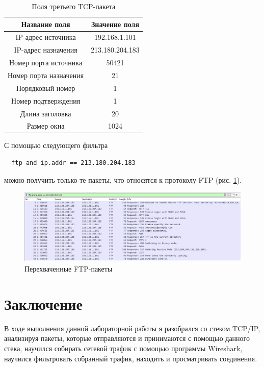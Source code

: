 \documentclass[a4paper, 14pt]{extarticle}
\begin{document}
\begin{table}[H]
  \caption{Поля третьего TCP-пакета}
  \label{tab:tcp-3}

  \centering
  \renewcommand*{\arraystretch}{1.2}
  \setlength{\tabcolsep}{12pt}

  \begin{tabular}{|c|c|}
    \hline
    \textbf{Название поля} & \textbf{Значение поля} \\
    \hline
    IP-адрес источника & 192.168.1.101 \\
    \hline
    IP-адрес назначения & 213.180.204.183 \\
    \hline
    Номер порта источника & 50421 \\
    \hline
    Номер порта назначения & 21 \\
    \hline
    Порядковый номер & 1 \\
    \hline
    Номер подтверждения & 1 \\
    \hline
    Длина заголовка & 20 \\
    \hline
    Размер окна & 1024 \\
    \hline
  \end{tabular}
\end{table}

С помощью следующего фильтра
\begin{verbatim}
  ftp and ip.addr == 213.180.204.183
\end{verbatim}
можно получить только те пакеты, что относятся к протоколу FTP (рис.
\ref{fig:ftp}).

\begin{figure}[H]
  \centering
  \includegraphics[width=\textwidth]{images/ftp.png}
  \caption{Перехваченные FTP-пакеты}
  \label{fig:ftp}
\end{figure}

\section{Заключение}

В ходе выполнения данной лабораторной работы я разобрался со стеком TCP/IP,
анализируя пакеты, которые отправляются и принимаются с помощью данного стека,
научился собирать сетевой трафик с помощью программы Wireshark, научился
фильтровать собранный трафик, находить и просматривать соединения.
\end{document}
